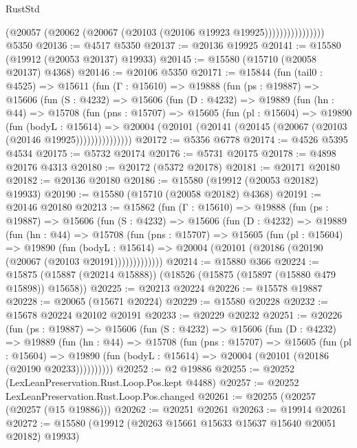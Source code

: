 \begin{lexlean}{RustStd}
\begin{coremodule}
                          (@20057 (@20062 (@20067 (@20103 (@20106 @19923 @19925))))))))))))))))
    @5350
@20136 := @4517 @5350
@20137 := @20136 @19925
@20141 := @15580 (@19912 (@20053 @20137) @19933)
@20145 := @15580 (@15710 (@20058 @20137) @4368)
@20146 := @20106 @5350
@20171 := @15844
    (fun (tail0 : @4525) =>
    @15611
      (fun (Γ : @15610) =>
      @19888
        (fun (ps : @19887) =>
        @15606
          (fun (S : @4232) =>
          @15606
            (fun (D : @4232) =>
            @19889
              (fun (hn : @44) =>
              @15708
                (fun (pns : @15707) =>
                @15605
                  (fun (pl : @15604) =>
                  @19890
                    (fun (bodyL : @15614) =>
                    @20004 (@20101 (@20141 (@20145 (@20067 (@20103 (@20146 @19925)))))))))))))))
@20172 := @5356 @6778
@20174 := @4526 @5395 @4534
@20175 := @5732 @20174
@20176 := @5731 @20175
@20178 := @4898 @20176 @4313
@20180 := @20172 (@5372 @20178)
@20181 := @20171 @20180
@20182 := @20136 @20180
@20186 := @15580 (@19912 (@20053 @20182) @19933)
@20190 := @15580 (@15710 (@20058 @20182) @4368)
@20191 := @20146 @20180
@20213 := @15862
    (fun (Γ : @15610) =>
    @19888
      (fun (ps : @19887) =>
      @15606
        (fun (S : @4232) =>
        @15606
          (fun (D : @4232) =>
          @19889
            (fun (hn : @44) =>
            @15708
              (fun (pns : @15707) =>
              @15605
                (fun (pl : @15604) =>
                @19890
                  (fun (bodyL : @15614) =>
                  @20004 (@20101 (@20186 (@20190 (@20067 (@20103 @20191)))))))))))))
@20214 := @15880 @366
@20224 := @15875 (@15887 (@20214 @15888)) (@18526 (@15875 (@15897 (@15880 @479 @15898)) @15658))
@20225 := @20213 @20224
@20226 := @15578 @19887
@20228 := @20065 (@15671 @20224)
@20229 := @15580 @20228
@20232 := @15678 @20224 @20102 @20191
@20233 := @20229 @20232
@20251 := @20226
    (fun (ps : @19887) =>
    @15606
      (fun (S : @4232) =>
      @15606
        (fun (D : @4232) =>
        @19889
          (fun (hn : @44) =>
          @15708
            (fun (pns : @15707) =>
            @15605
              (fun (pl : @15604) =>
              @19890 (fun (bodyL : @15614) => @20004 (@20101 (@20186 (@20190 @20233))))))))))
@20252 := @2 @19886
@20255 := @20252 (LexLeanPreservation.Rust.Loop.Pos.kept @4488)
@20257 := @20252 LexLeanPreservation.Rust.Loop.Pos.changed
@20261 := @20255 (@20257 (@20257 (@15 @19886)))
@20262 := @20251 @20261
@20263 := @19914 @20261
@20272 := @15580 (@19912 (@20263 @15661 @15633 @15637 @15640 @20051 @20182) @19933)

\end{coremodule}
\end{lexlean}
